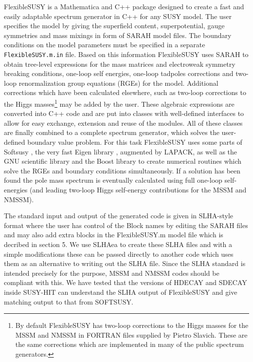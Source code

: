 \documentclass[final,3p,11pt,pdflatex]{elsarticle}
\makeatletter
\newcommand{\sarah}{SARAH\@\xspace}
\newcommand{\fs}{FlexibleSUSY\@\xspace}
\newcommand{\mathematica}{Mathematica\xspace}
\newcommand{\code}[1]{\lstinline|#1|}  %
\makeatother
\begin{document}
\fs is a \mathematica and C++ package designed to create a fast and easily
adaptable spectrum generator in C++ for any SUSY model.
The user specifies the model by giving the
superfield content, superpotential, gauge symmetries and mass mixings
in form of \sarah model files.  The boundary conditions on the model
parameters must be specified in a separate \code{FlexibleSUSY.m.in} file.
Based on this information \fs uses \sarah to obtain tree-level
expressions for the mass matrices and electroweak symmetry breaking
conditions, one-loop self energies, one-loop tadpoles corrections and
two-loop renormalization group equations (RGEs) for the model.
Additional corrections which have been calculated elsewhere, such as
two-loop corrections to the Higgs masses\footnote{By default
  \fs has two-loop corrections to the Higgs masses for the
  MSSM
  \cite{Degrassi:2001yf,Brignole:2001jy,Dedes:2002dy,Brignole:2002bz,Dedes:2003km}
  and NMSSM \cite{Degrassi:2009yq} in FORTRAN files supplied by Pietro
  Slavich. These are the same corrections which are implemented in
  many of the public spectrum generators.} may be added by the user.
%
These algebraic expressions are converted into C++ code and are put
into classes with well-defined interfaces to allow for easy exchange,
extension and reuse of the modules.  All of these classes are finally
combined to a complete spectrum generator, which solves the
user-defined boundary value problem.  For this task \fs uses some
parts of Softsusy \cite{Allanach:2001kg}, the very fast Eigen library
\cite{eigen}, augmented by LAPACK, as well as the GNU scientific
library and the Boost library to create numerical routines which solve
the RGEs and boundary conditions simultaneously.  If a solution has
been found the pole mass spectrum is eventually calculated using full
one-loop self-energies (and leading two-loop Higgs self-energy
contributions for the MSSM and NMSSM).

The standard input and output of the generated code is given in
SLHA-style format where the user has control of the Block names by
editing the SARAH files and may also add extra blocks in the
FlexibleSUSY.m model file which is decribed in section 5. We use
SLHAea \cite{slhaea} to create these SLHA files and with a simple
modifications these can be passed directly to another code which uses
them as an alternative to writing out the SLHA file. Since the SLHA
standard is intended precisely for the purpose, MSSM and NMSSM codes
should be compliant with this.  We have tested that the versions of
HDECAY\cite{hdecay} and SDECAY\cite{sdecay} inside SUSY-HIT
\cite{susyhit} can understand the SLHA output of FlexibleSUSY and give
matching output to that from SOFTSUSY.
\end{document}
